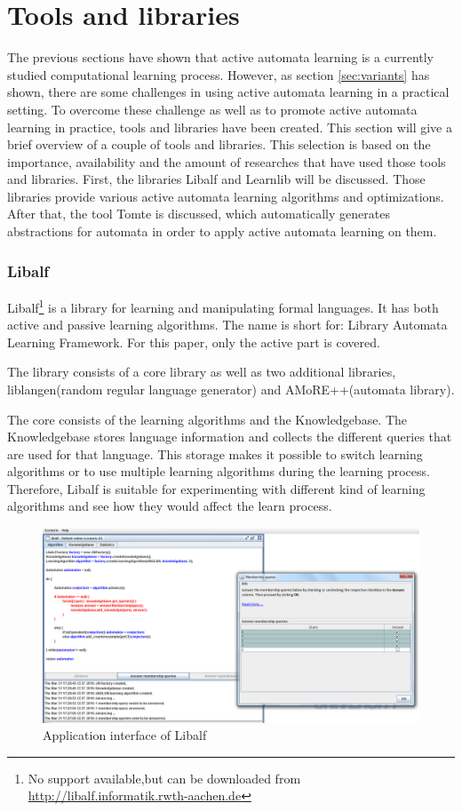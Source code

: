 \documentclass[multi,crop=false,class=article]{standalone}
\begin{document}
\section{Tools and libraries}
\label{sec:tools}
The previous sections have shown that active automata learning is a currently 
studied computational learning process. However, as section 
\cref{sec:variants} has shown, there are some challenges in using active 
automata learning in a practical setting. To overcome these challenge as well 
as to promote active automata learning in practice, tools and libraries have 
been created. This section will give a brief overview of a couple of tools and 
libraries. This selection is based on the importance, availability and the 
amount of researches that have used those tools and libraries. First, the 
libraries Libalf and Learnlib will be discussed. Those libraries provide 
various active automata learning algorithms and optimizations. After that, the 
tool Tomte is discussed, which automatically generates abstractions for 
automata in order to apply active automata learning on them. 


\subsubsection{Libalf}
\label{sssec:libalf}
Libalf\footnote{No support available,but can be downloaded from 
	\url{http://libalf.informatik.rwth-aachen.de}} is a library for learning 
	and manipulating formal languages. It has both active and passive learning 
	algorithms. The name is short for: Library Automata Learning Framework. For 
	this paper, only the active part is covered.

The library consists of a core library as well as two additional libraries, 
liblangen(random regular language generator) and AMoRE++(automata library).

The core consists of the learning algorithms and the Knowledgebase. The 
Knowledgebase stores language information and collects the different queries 
that are used for that language. This storage makes it possible to switch 
learning algorithms or to use multiple learning algorithms during the learning 
process. Therefore, Libalf is suitable for experimenting with different kind of 
learning algorithms and see how they would affect the learn process. 

\begin{figure}[!ht]
	\includegraphics[width=\textwidth]{Tool_images/libalf_demo_interface.png}
	\caption{Application interface of Libalf}
	\label{fig:libalf_interface}
\end{figure}
\end{document}
